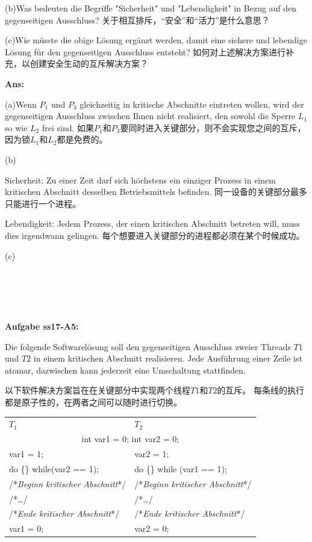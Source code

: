 \documentclass[fleqn]{article}
\begin{document}
(b)Was bedeuten die Begriffe "Sicherheit" und "Lebendigkeit" in Bezug auf den gegenseitigen Ausschluss?
关于相互排斥，“安全”和“活力”是什么意思？

(c)Wie müsste die obige Lösung ergänzt werden, damit eine sichere und lebendige Lösung für den gegenseitigen Ausschluss entsteht?
如何对上述解决方案进行补充，以创建安全生动的互斥解决方案？

\textbf{Ans:} 

(a)Wenn $P_1$ und $P_3$ gleichzeitig in kritische Abschnitte eintreten wollen, wird der gegenseitigen Ausschluss zwischen Ihnen nicht realisiert, den sowohl die Sperre $L_1$ so wie $L_2$ frei sind.
如果$ P_1 $和$ P_3 $要同时进入关键部分，则不会实现您之间的互斥，因为锁$ L_1 $和$ L_2 $都是免费的。

(b)

Sicherheit: Zu einer Zeit darf sich höchstens ein einziger Prozess in einem kritischen Abschnitt desselben Betriebsmittels befinden.
同一设备的关键部分最多只能进行一个进程。

Lebendigkeit: Jedem Prozess, der einen kritischen Abschnitt betreten will, muss dies irgendwann gelingen.
每个想要进入关键部分的进程都必须在某个时候成功。

(c)
\\
\\
\\
\\
\\
\\
\noindent\textbf{Aufgabe ss17-A5:}

Die folgende Softwarelösung soll den gegenseitigen Ausschluss zweier Threads $T1$ und $T2$
 in einem kritischen Abschnitt realisieren. Jede Ausführung einer Zeile ist atomar, dazwischen kann jederzeit eine Umschaltung stattfinden.

以下软件解决方案旨在在关键部分中实现两个线程$ T1 $和$ T2 $的互斥。 每条线的执行都是原子性的，在两者之间可以随时进行切换。

\begin{center}
    \begin{tabular}{l|l}
        $T_1$&$T_2$\\
        \multicolumn{2}{c}{int var1 = 0; int var2 = 0;}\\
        var1 = 1; & var2 = 1;\\
        do \{\} while(var2 == 1);& do \{\} while (var1 == 1);\\
        /*\textit{Beginn kritischer Abschnitt}*/&/*\textit{Beginn kritischer Abschnitt}*/\\
        /*\dots*/&/*\dots*/\\
        /*\textit{Ende kritischer Abschnitt}*/&/*\textit{Ende kritischer Abschnitt}*/\\
        var1 = 0; & var2 = 0;
    \end{tabular}
\end{center}
\end{document}
